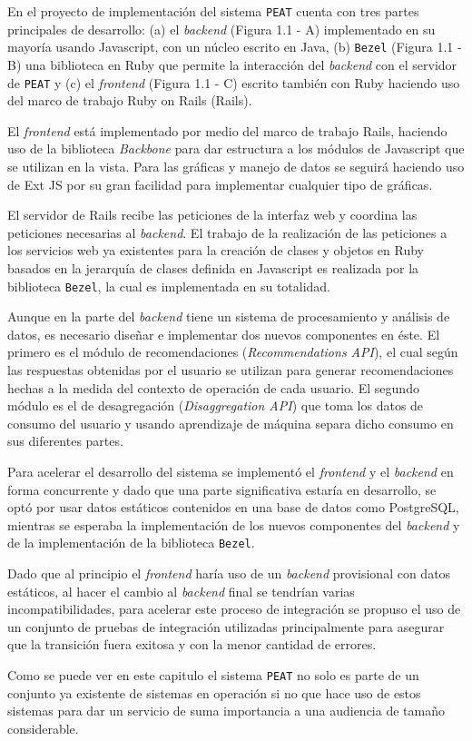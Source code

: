 En el proyecto de implementación del sistema \texttt{PEAT}
cuenta con tres partes principales de desarrollo:
(a) el \textit{backend} (Figura 1.1 - A) implementado en su mayoría usando
Javascript, con un núcleo escrito en Java, (b) \texttt{Bezel} (Figura 1.1 - B)
una biblioteca en Ruby que permite la interacción del \textit{backend}
con el servidor de \texttt{PEAT} y (c) el \textit{frontend} (Figura 1.1 - C) escrito
también con Ruby haciendo uso del marco de trabajo Ruby on Rails (Rails).


\pagebreak

El \textit{frontend} está implementado por medio del marco de trabajo
Rails, haciendo uso de la biblioteca \textit{Backbone}
para dar estructura a los módulos de Javascript que se utilizan en la vista.
Para las gráficas y manejo de datos se seguirá haciendo uso de Ext JS
por su gran facilidad para implementar cualquier tipo de gráficas.

El servidor de Rails recibe las peticiones de la interfaz web y
coordina las peticiones necesarias al \textit{backend}. El trabajo
de la realización de las peticiones a los servicios web ya existentes para la
creación de clases y objetos en Ruby basados en la jerarquía de clases
definida en Javascript es realizada por la biblioteca \texttt{Bezel},
la cual es implementada en su totalidad.

Aunque en la parte del \textit{backend} tiene un sistema de procesamiento
y análisis de datos, es necesario diseñar e implementar dos nuevos componentes
en éste. El primero es el módulo de recomendaciones (\textit{Recommendations API}),
el cual según las respuestas obtenidas por el usuario se utilizan para generar
recomendaciones hechas a la medida del contexto de operación de cada usuario.
El segundo módulo es el de desagregación (\textit{Disaggregation API}) que toma los
datos de consumo del usuario y usando aprendizaje de máquina separa dicho consumo
en sus diferentes partes.

Para acelerar el desarrollo del sistema se implementó el \textit{frontend}
y el \textit{backend} en forma concurrente y dado que una parte significativa
estaría en desarrollo, se optó por usar datos estáticos contenidos
en una base de datos como PostgreSQL, mientras se esperaba la implementación
de los nuevos componentes del \textit{backend} y de la implementación de la
biblioteca \texttt{Bezel}.

Dado que al principio el \textit{frontend} haría uso de un \textit{backend}
provisional con datos estáticos, al hacer el cambio al \textit{backend} final
se tendrían varias incompatibilidades, para acelerar este proceso de integración
se propuso el uso de un conjunto de pruebas de integración utilizadas
principalmente para asegurar que la transición fuera exitosa y con la menor
cantidad de errores.

Como se puede ver en este capitulo el sistema \texttt{PEAT} no solo es parte de
un conjunto ya existente de sistemas en operación si no que hace uso de estos
sistemas para dar un servicio de suma importancia a una audiencia de tamaño
considerable.

